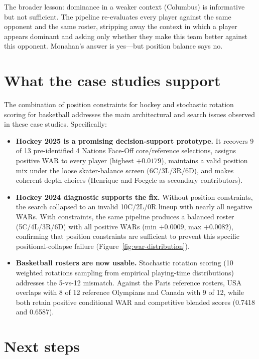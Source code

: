 \documentclass[12pt,letterpaper]{article}
\begin{document}
The broader lesson: dominance in a weaker context (Columbus) is
informative but not sufficient.
The pipeline re-evaluates every player against the same opponent and
the same roster, stripping away the context in which a player appears
dominant and asking only whether they make this team better against
this opponent.
Monahan's answer is yes---but position balance says no.

\section{What the case studies support}

The combination of position constraints for hockey and stochastic
rotation scoring for basketball addresses the main architectural and
search issues observed in these case studies.
Specifically:

\begin{itemize}[leftmargin=*]
  \item \textbf{Hockey 2025 is a promising decision-support prototype.}
    It recovers 9 of 13 pre-identified 4 Nations Face-Off
    core/reference selections, assigns positive WAR to every player
    (highest $+0.0179$), maintains a valid position mix under the loose
    skater-balance screen (6C/3L/3R/6D), and makes coherent depth
    choices (Henrique and Foegele as secondary contributors).
  \item \textbf{Hockey 2024 diagnostic supports the fix.}
    Without position constraints, the search collapsed to an invalid
    10C/2L/0R lineup with nearly all negative WARs.
    With constraints, the same pipeline produces a balanced roster
    (5C/4L/3R/6D) with all positive WARs
    (min $+0.0009$, max $+0.0082$), confirming that position
    constraints are sufficient to prevent this specific
    positional-collapse failure (Figure~\ref{fig:war-distribution}).
  \item \textbf{Basketball rosters are now usable.}
    Stochastic rotation scoring (10 weighted rotations sampling from
    empirical playing-time distributions) addresses the 5-vs-12
    mismatch.
    Against the Paris reference rosters, USA overlaps with 8 of 12
    reference Olympians and Canada with 9 of 12, while both retain
    positive conditional WAR and competitive blended scores (0.7418
    and 0.6587).
\end{itemize}

\section{Next steps}
\end{document}
